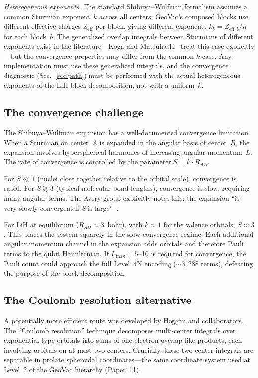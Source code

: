 \documentclass[aps,pra,twocolumn,superscriptaddress,longbibliography]{revtex4-2}
\begin{document}
\emph{Heterogeneous exponents.}  The standard Shibuya--Wulfman
formalism assumes a common Sturmian exponent~$k$ across all centers.
GeoVac's composed blocks use different effective charges
$Z_{\mathrm{eff}}$ per block, giving different exponents
$k_b = Z_{\mathrm{eff},b}/n$ for each block~$b$.  The generalized
overlap integrals between Sturmians of different exponents exist in
the literature---Koga and Matsuhashi~\cite{koga1987} treat this
case explicitly---but the convergence properties may differ from the
common-$k$ case.  Any implementation must use these generalized
integrals, and the convergence diagnostic (Sec.~\ref{sec:path})
must be performed with the actual heterogeneous exponents of the
LiH block decomposition, not with a uniform~$k$.

\subsection{The convergence challenge}

The Shibuya--Wulfman expansion has a well-documented convergence
limitation.  When a Sturmian on center~$A$ is expanded in the
angular basis of center~$B$, the expansion involves hyperspherical
harmonics of increasing angular momentum~$L$.  The rate of convergence
is controlled by the parameter $S = k \cdot R_{AB}$.

For $S \ll 1$ (nuclei close together relative to the orbital scale),
convergence is rapid.  For $S \gtrsim 3$ (typical molecular bond
lengths), convergence is slow, requiring many angular terms.  The
Avery group explicitly notes this: the expansion ``is very slowly
convergent if $S$ is large''~\cite{avery2012}.

For LiH at equilibrium ($R_{AB} \approx 3$~bohr), with $k \approx 1$
for the valence orbitals, $S \approx 3$.  This places the system
squarely in the slow-convergence regime.  Each additional angular
momentum channel in the expansion adds orbitals and therefore Pauli
terms to the qubit Hamiltonian.  If $L_{\max} = 5$--10 is required
for convergence, the Pauli count could approach the full Level~4N
encoding (${\sim}3{,}288$ terms), defeating the purpose of the block
decomposition.

\subsection{The Coulomb resolution alternative}

A potentially more efficient route was developed by Hoggan and
collaborators~\cite{hoggan2011}.  The ``Coulomb resolution'' technique
decomposes multi-center integrals over exponential-type orbitals into
sums of one-electron overlap-like products, each involving orbitals on
at most two centers.  Crucially, these two-center integrals are
separable in prolate spheroidal coordinates---the same coordinate
system used at Level~2 of the GeoVac hierarchy (Paper~11).
\end{document}
